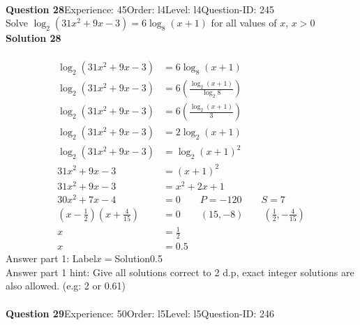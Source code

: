 \documentclass{article}
\begin{document}
\\[4pt]
\noindent\textbf{Question 28}\hspace{20pt}Experience: 45\hspace{20pt}Order: l4\hspace{20pt}Level: l4\hspace{20pt}Question-ID: 245\\[2pt]
Solve $\log_{2}(31x^2+9x-3)=6\log_{8}(x+1)$ for all values of $x$, $x>0$\\[4pt]
\noindent\textbf{Solution 28}\\[2pt]
\\[-35pt]\begin{align*}
\log_{2}(31x^2+9x-3)&=6\log_{8}(x+1)\\[2pt]
\log_{2}(31x^2+9x-3)&=6\left(\displaystyle\frac{\log_{2}(x+1)}{\log_{2}8}\right)\\[2pt]
\log_{2}(31x^2+9x-3)&=6\left(\displaystyle\frac{\log_{2}(x+1)}{3}\right)\\[2pt]
\log_{2}(31x^2+9x-3)&=2\log_{2}(x+1)\\[2pt]
\log_{2}(31x^2+9x-3)&=\log_{2}(x+1)^2\\[2pt]
31x^2+9x-3&=(x+1)^2\\[2pt]
31x^2+9x-3&=x^2+2x+1\\[2pt]
30x^2+7x-4&=0\qquad P=-120 \qquad S=7\\[2pt]
\left(x-\displaystyle\frac{1}{2}\right)\left(x+\displaystyle\frac{4}{15}\right)&=0\qquad (15,-8)\qquad\left(\displaystyle\frac{1}{2},-\displaystyle\frac{4}{15}\right)\\[2pt]
x&=\displaystyle\frac{1}{2}\\[2pt]
x&=0.5
\end{align*}
Answer part 1: \hspace{10pt}Label\hspace{10pt}$x=$\hspace{10pt}Solution\hspace{10pt}0.5\\
Answer part 1 hint: \hspace{15pt}Give all solutions correct to 2 d.p, exact integer solutions are also allowed. (e.g: 2 or 0.61)\\
\\[4pt]
\noindent\textbf{Question 29}\hspace{20pt}Experience: 50\hspace{20pt}Order: l5\hspace{20pt}Level: l5\hspace{20pt}Question-ID: 246\\[2pt]
\end{document}
